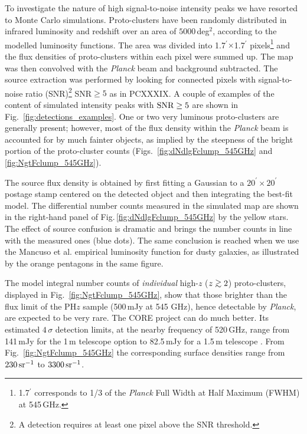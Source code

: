 \documentclass[useAMS,usenatbib]{mn2e}
\def\simgt{\mathrel{\rlap{\lower 3pt\hbox{$\sim$}} \raise2.0pt\hbox{$>$}}}
\begin{document}
To investigate the nature of high signal-to-noise intensity peaks we
have resorted to Monte Carlo simulations. Proto-clusters
have been randomly distributed
in infrared luminosity and redshift over an area of $5000$\,deg$^{2}$,
according to the modelled luminosity functions. The area was divided into
1.7$^{\prime}$$\times$1.7$^{\prime}$ pixels\footnote{1.7$^{\prime}$
  corresponds to 1/3 of the {\it Planck} Full Width at Half Maximum
  (FWHM) at 545\,GHz.} and the flux densities of proto-clusters
within each pixel were summed up. The map was then convolved with the
{\it Planck} beam
and background
subtracted.
The source extraction was performed by looking
for connected pixels with signal-to-noise ratio (SNR)\footnote{A detection requires at least one pixel above the
  SNR threshold.} SNR$\ge5$ as in PCXXXIX. A couple of examples of the
content of simulated intensity peaks with $\hbox{SNR}\ge 5$ are shown
in Fig.~\ref{fig:detections_examples}. One or two very luminous
proto-clusters are generally present; however, most of the flux
density within the \textit{Planck} beam is accounted for by much
fainter objects, as implied by the steepness of the bright portion of
the proto-cluster counts (Figs.~\ref{fig:dNdlgFclump_545GHz} and
\ref{fig:NgtFclump_545GHz}).

The source flux density is obtained by first fitting a Gaussian to a
$20^{\prime}\times 20^\prime$ postage stamp centered on the detected
object and then integrating the best-fit model.
The differential number counts measured in
the simulated map are shown in the right-hand panel of
Fig.\,\ref{fig:dNdlgFclump_545GHz} by the yellow stars. The effect of source confusion
is dramatic and brings the number counts in line with the
measured ones (blue dots). The same conclusion is reached when
  we use the Mancuso et al. empirical luminosity function for dusty
  galaxies, as illustrated by the orange pentagons in the same figure.


The model integral number counts of \textit{individual} high-$z$ ($z\simgt 2$) proto-clusters, displayed in Fig.~\ref{fig:NgtFclump_545GHz}, show that those brighter than the flux limit of the PH$z$ sample (500\,mJy at 545 GHz), hence detectable by \textit{Planck}, are expected to be very rare. The CORE project can do much better. Its estimated $4\,\sigma$ detection limits, at the nearby frequency of 520\,GHz, range from 141\,mJy for the 1\,m telescope option to 82.5\,mJy for a 1.5\,m telescope \citep{DeZotti2016}. From Fig.~\ref{fig:NgtFclump_545GHz} the corresponding surface densities range from $230\,\hbox{sr}^{-1}$ to $3300\,\hbox{sr}^{-1}$.
\end{document}

